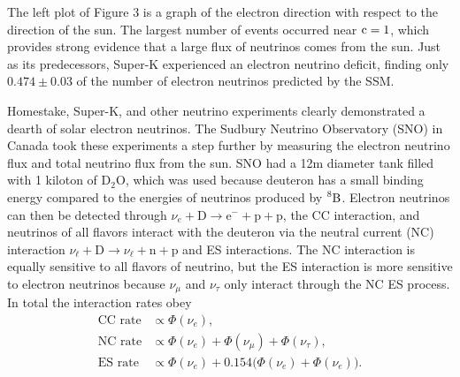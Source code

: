 The left plot of Figure 3 is a graph of the electron direction with
respect to the
direction of the sun. The largest number of events occurred near $\operatorname{c}=1$,
which provides strong evidence that a large flux of neutrinos comes from the
sun. Just as its predecessors, Super-K experienced an electron neutrino
deficit, finding only $0.474\pm0.03$ of the number of electron neutrinos
predicted by the SSM.

Homestake, Super-K, and other neutrino experiments clearly demonstrated
a dearth of solar electron neutrinos. The Sudbury Neutrino Observatory (SNO)
in Canada took these experiments a step further by measuring the
electron neutrino flux and total neutrino flux from the sun. SNO had a 12m
diameter tank filled with 1 kiloton of $\text{D}_2\text{O}$, which was used
because deuteron has a small binding energy compared to the energies of
neutrinos produced by $\prescript{8}{}{\text{B}}$. Electron neutrinos can then
be detected through
$\nu_e+\text{D}\to\text{e}^-+\text{p}+\text{p}$,
the CC interaction, and neutrinos of all flavors
interact with the deuteron via the neutral current (NC) interaction
$\nu_\ell+\text{D}\to\nu_\ell+\text{n}+\text{p}$ and ES interactions. The NC
interaction is equally sensitive to all flavors of neutrino, but the ES
interaction is more sensitive to electron neutrinos because $\nu_\mu$ and
$\nu_\tau$ only interact through the NC ES process. In total the interaction
rates obey
\begin{equation}
  \begin{aligned}
    \text{CC rate}&\propto\Phi(\nu_e), \\
    \text{NC rate}&\propto\Phi(\nu_e)+\Phi(\nu_\mu)+\Phi(\nu_\tau), \\
    \text{ES rate}&\propto\Phi(\nu_e)+0.154\big(\Phi(\nu_e)+\Phi(\nu_e)\big).
  \end{aligned}
\end{equation}

